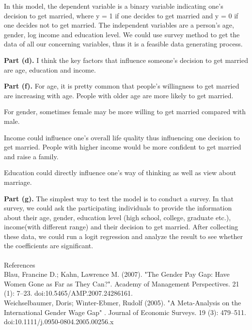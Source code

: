 \documentclass[letterpaper,12pt]{article}
\theoremstyle{definition}
\begin{document}
In this model, the dependent variable is a binary variable indicating one's decision to get married, where y = 1 if one decides to get married and y = 0 if one decides not to get married. The independent variables are a person's age, gender, log income and education level.
We could use survey method to get the data of all our concerning variables, thus it is a feasible data generating process.

\textbf{Part (d).}
I think the key factors that influence someone's decision to get married are age, education and income. 

\textbf{Part (f).}
For age, it is pretty common that people's willingness to get married are increasing with age.   People with older age are more likely to get married.  

For gender, sometimes female may be more willing to get married compared with male.

Income could influence one's overall life quality thus influencing one decision to get married. People with higher income would be more confident to get married and raise a family.

Education could directly influence one's way of thinking as well as view about marriage.
 
\textbf{Part (g).}
 The simplest way to test the model is to conduct a survey. In that survey, we could ask the participating individuals to provide the information about their age, gender, education level (high school, college, graduate etc.), income(with different range) and their decision to get married. After collecting these data, we could run a logit regression and analyze the result to see whether the coefficients are significant.
\\
\\
\noindent References\\

\noindent Blau, Francine D.; Kahn, Lawrence M. (2007). "The Gender Pay Gap: Have Women Gone as Far as They Can?". Academy of Management Perspectives. 21 (1): 7–23. doi:10.5465/AMP.2007.24286161.\\


\noindent Weichselbaumer, Doris; Winter-Ebmer, Rudolf (2005). "A Meta-Analysis on the International Gender Wage Gap" . Journal of Economic Surveys. 19 (3): 479–511. doi:10.1111/j.0950-0804.2005.00256.x
\end{document}
